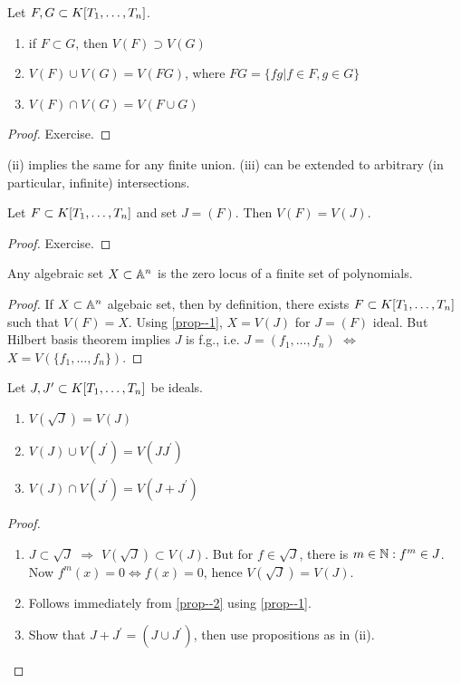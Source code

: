 \documentclass[a4paper,11pt]{article}
\begin{document}
			\begin{prop}\label{prop--2}
				Let $F,G\subset\K$.
				\begin{enumerate}
					\item if $F\subset G$, then $V(F)\supset V(G)$
					\item $V(F)\cup V(G)=V(FG)$, where $FG=\{fg|f\in F,g\in G\}$
					\item $V(F)\cap V(G)=V(F\cup G)$
				\end{enumerate}
			\end{prop}
			\begin{proof}\renewcommand{\qedsymbol}{}
				Exercise.
			\end{proof}\renewcommand{\qedsymbol}{$\square$}

			\begin{remark}
				(ii) implies the same for any finite union. (iii) can be extended to arbitrary (in particular, infinite) intersections.
			\end{remark}

			\begin{prop}\label{prop--1}
				Let $F\subset\K$ and set $J=(F)$. Then $V(F)=V(J)$.
			\end{prop}
			\begin{proof}\renewcommand{\qedsymbol}{}
				Exercise.
			\end{proof}\renewcommand{\qedsymbol}{$\square$}

			\begin{cor}
				Any algebraic set $X\subset\AA^n$ is the zero locus of a finite set of polynomials.
			\end{cor}
			\begin{proof}
				If $X\subset\AA^n$ algebaic set, then by definition, there exists $F\subset\K$ such that $V(F)=X$. Using \autoref{prop--1}, $X=V(J)$ for $J=(F)$ ideal. But Hilbert basis theorem implies $J$ is f.g., i.e. $J=(f_1,\dots,f_n)$ $\Longleftrightarrow$ $X=V(\{f_1,\dots,f_n\})$.
			\end{proof}

			\begin{cor}\label{cor--topology}
				Let $J,J^{\prime}\subset\K$ be ideals.
				\begin{enumerate}
					\item $V(\sqrt{J})=V(J)$
					\item $V(J)\cup V(J^{\prime})=V(JJ^{\prime})$
					\item $V(J)\cap V(J^{\prime})=V(J+J^{\prime})$
				\end{enumerate}
			\end{cor}
			\begin{proof}
				\begin{enumerate}
					\item $J\subset\sqrt{J}$ $\Longrightarrow$ $V(\sqrt{J})\subset V(J)$. But for $f\in\sqrt{J}$, there is $m\in\N:f^m\in J$. Now $f^m(x)=0\Longleftrightarrow f(x)=0$, hence $V(\sqrt{J})=V(J)$.
					\item Follows immediately from \autoref{prop--2} using \autoref{prop--1}.
					\item Show that $J+J^{\prime}=(J\cup J^{\prime})$, then use propositions as in (ii).
				\end{enumerate}
			\end{proof}
\end{document}
